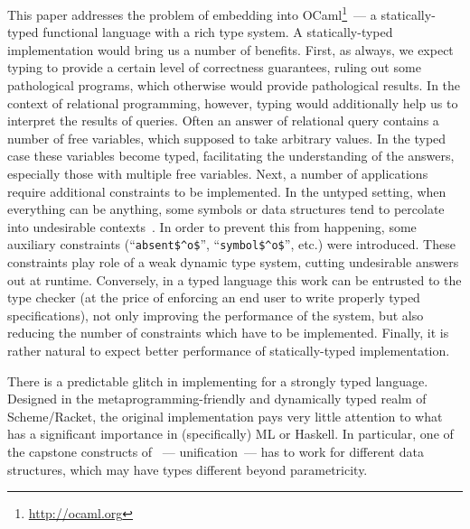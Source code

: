 This paper addresses the problem of embedding \miniKanren into OCaml\footnote{\url{http://ocaml.org}}~--- a statically-typed functional language with 
a rich type system. A statically-typed implementation would bring us a number of benefits. First, as always, 
we expect typing to provide a certain level of correctness guarantees, ruling out some pathological programs, which
otherwise would provide pathological results. In the context of relational programming, however, typing would additionally 
help us to interpret the results of queries. Often an answer of relational query contains a number of
free variables, which supposed to take arbitrary values. In the typed case these variables become typed,  
facilitating the understanding of the answers, especially those with multiple free variables. Next, a number of \miniKanren 
applications require additional constraints to be implemented. In the untyped setting, when everything can be anything, 
some symbols or data structures tend to percolate into undesirable contexts~\cite{Untagged}. In order to prevent this from happening, some 
auxiliary constraints (``\lstinline{absent$^o$}'', ``\lstinline{symbol$^o$}'', etc.) were introduced. These constraints play role of 
a weak dynamic type system, cutting undesirable answers out at runtime. Conversely, in a typed language this work can be
entrusted to the type checker (at the price of enforcing an end user to write properly typed specifications), not only improving the
performance of the system, but also reducing the number of constraints which have to be implemented. Finally, it is rather natural
to expect better performance of statically-typed implementation.

There is a predictable glitch in implementing \miniKanren for a strongly typed language. 
Designed in the metaprogramming-friendly and dynamically typed realm of Scheme/Racket, the original 
\miniKanren implementation pays very little attention to what has a significant importance in (specifically) 
ML or Haskell. In particular, one of the capstone constructs of \miniKanren~--- unification~--- has to work for 
different data structures, which may have types different beyond parametricity.

